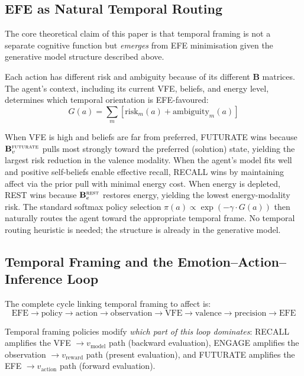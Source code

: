 \documentclass[11pt,a4paper]{article}
\begin{document}
\subsection{EFE as Natural Temporal Routing}\label{sec:efe_routing}

The core theoretical claim of this paper is that temporal framing is not a separate cognitive function but \emph{emerges} from EFE minimisation given the generative model structure described above.

Each action has different risk and ambiguity because of its different $\mathbf{B}$ matrices. The agent's context, including its current VFE, beliefs, and energy level, determines which temporal orientation is EFE-favoured:
\begin{equation}
    G(a) = \sum_m \left[\text{risk}_m(a) + \text{ambiguity}_m(a)\right]
\end{equation}

When VFE is high and beliefs are far from preferred, FUTURATE wins because $\mathbf{B}_v^{\textsc{futurate}}$ pulls most strongly toward the preferred (solution) state, yielding the largest risk reduction in the valence modality. When the agent's model fits well and positive self-beliefs enable effective recall, RECALL wins by maintaining affect via the prior pull with minimal energy cost. When energy is depleted, REST wins because $\mathbf{B}_e^{\textsc{rest}}$ restores energy, yielding the lowest energy-modality risk. The standard softmax policy selection $\pi(a) \propto \exp(-\gamma \cdot G(a))$ then naturally routes the agent toward the appropriate temporal frame. No temporal routing heuristic is needed; the structure is already in the generative model.

\subsection{Temporal Framing and the Emotion--Action--Inference Loop}\label{sec:loop}

The complete cycle linking temporal framing to affect is:
\begin{equation}
    \text{EFE} \to \text{policy} \to \text{action} \to \text{observation} \to \text{VFE} \to \text{valence} \to \text{precision} \to \text{EFE}
\end{equation}

Temporal framing policies modify \emph{which part of this loop dominates}: RECALL amplifies the VFE $\to v_{\text{model}}$ path (backward evaluation), ENGAGE amplifies the observation $\to v_{\text{reward}}$ path (present evaluation), and FUTURATE amplifies the EFE $\to v_{\text{action}}$ path (forward evaluation).
\end{document}

